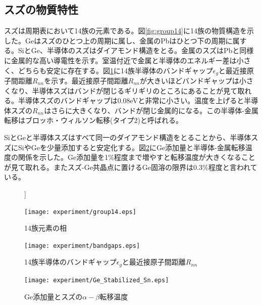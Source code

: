 \subsection{スズの物質特性}
スズは周期表において14族の元素である。図\ref{fig:group14}に14族の物質構造を示した。Geはスズのひとつ上の周期に属し、金属のPbはひとつ下の周期に属する。SiとGe、半導体のスズはダイアモンド構造をとる。金属のスズはPbと同様に金属的な高い導電性を示す。室温付近で金属と半導体のエネルギー差は小さく、どちらも安定に存在する。図\ref{fig:bandgaps}に14族半導体のバンドギャップ$\epsilon_g$と最近接原子間距離$R_{nn}$を示す\cite{Yonezawa}。最近接原子間距離$R_{nn}$が大きいほどバンドギャップは小さくなり、半導体スズはバンドが閉じるギリギリのところにあることが見て取れる。半導体スズのバンドギャップは0.08eVと非常に小さい。温度を上げると半導体スズの$R_{nn}$はさらに大きくなり、バンドが閉じ金属的になる。この半導体-金属転移はブロッホ・ウィルソン転移(タイプ2)と呼ばれる\cite{Yonezawa}。

SiとGeと半導体スズはすべて同一のダイアモンド構造をとることから、半導体スズにSiやGeを少量添加すると安定化する\cite{Ewald1954,Gallerneault1983}。図\ref{fig:Ge_Stabilized_Sn}にGe添加量と半導体-金属転移温度の関係を示した\cite{Vnuk1984}。Ge添加量を1\%程度まで増やすと転移温度が大きくなることが見て取れる。またスズ-Ge共晶点に置けるGe固溶の限界は0.3\%程度と言われている\cite{Thurmond1960}。

\begin{figure}[htb]]
 \begin{minipage}{0.4\hsize}
  \begin{center}
   \texttt{[image: experiment/group14.eps]}
  \end{center}
  \caption{14族元素の相}
  \label{fig:group14}
 \end{minipage}
 \begin{minipage}{0.6\hsize}
  \begin{center}
   \texttt{[image: experiment/bandgaps.eps]}
  \end{center}
  \caption{14族半導体のバンドギャップ$\epsilon_g$と最近接原子間距離$R_{nn}$\cite{Yonezawa}}
  \label{fig:bandgaps}
 \end{minipage}
\end{figure}

\begin{figure}[htb]
    \begin{center}
   \texttt{[image: experiment/Ge\_Stabilized\_Sn.eps]}
  \end{center}
  \caption{Ge添加量とスズの$\alpha-\beta$転移温度\cite{Vnuk1984}}
  \label{fig:Ge_Stabilized_Sn}
\end{figure}



